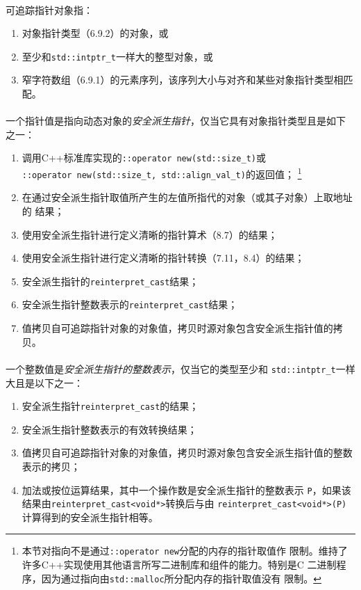 \paragraph{}
可追踪指针对象指：
\begin{enumerate}
  \item{对象指针类型（6.9.2）的对象，或}
  \item{至少和\texttt{std::intptr\_t}一样大的整型对象，或}
  \item{窄字符数组（6.9.1）的元素序列，该序列大小与对齐和某些对象指针类型相匹
    配。}
\end{enumerate}

\paragraph{}
一个指针值是指向动态对象的\textit{安全派生指针}，仅当它具有对象指针类型且是如下
之一：
\begin{enumerate}
  \item{调用C++标准库实现的\texttt{::operator new(std::size\_t)}或 \\
    \texttt{::operator new(std::size\_t, std::align\_val\_t)}的返回值；
      \footnote{本节对指向不是通过\texttt{::operator new}分配的内存的指针取值作
        限制。维持了许多C++实现使用其他语言所写二进制库和组件的能力。特别是C
        二进制程序，因为通过指向由\texttt{std::malloc}所分配内存的指针取值没有
        限制。}}
  \item{在通过安全派生指针取值所产生的左值所指代的对象（或其子对象）上取地址的
    结果；}
  \item{使用安全派生指针进行定义清晰的指针算术（8.7）的结果；}
  \item{使用安全派生指针进行定义清晰的指针转换（7.11，8.4）的结果；}
  \item{安全派生指针的\texttt{reinterpret\_cast}结果；}
  \item{安全派生指针整数表示的\texttt{reinterpret\_cast}结果；}
  \item{值拷贝自可追踪指针对象的对象值，拷贝时源对象包含安全派生指针值的拷贝。}
\end{enumerate}

\paragraph{}
一个整数值是\textit{安全派生指针的整数表示}，仅当它的类型至少和
\texttt{std::intptr\_t}一样大且是以下之一：
\begin{enumerate}
  \item{安全派生指针\texttt{reinterpret\_cast}的结果；}
  \item{安全派生指针整数表示的有效转换结果；}
  \item{值拷贝自可追踪指针对象的对象值，拷贝时源对象包含安全派生指针值的整数
      表示的拷贝；}
    \item{加法或按位运算结果，其中一个操作数是安全派生指针的整数表示
      \texttt{P}，如果该结果由\texttt{reinterpret\_cast<void*>}转换后与由
    \texttt{reinterpret\_cast<void*>(P)}计算得到的安全派生指针相等。}
\end{enumerate}


